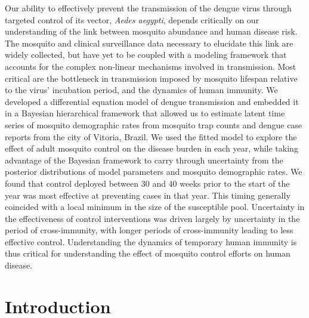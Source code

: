 \documentclass[10pt,letterpaper]{article}
\begin{document}
Our ability to effectively prevent the transmission of the dengue virus through targeted control of its vector, \emph{Aedes aegypti}, depends critically on our understanding of the link between mosquito abundance and human disease risk.
The mosquito and clinical surveillance data necessary to elucidate this link are widely collected, but have yet to be coupled with a modeling framework that accounts for the complex non-linear mechanisms involved in transmission.
Most critical are the bottleneck in transmission imposed by mosquito lifespan relative to the virus' incubation period, and the dynamics of human immunity.
We developed a differential equation model of dengue transmission and embedded it in a Bayesian hierarchical framework that allowed us to estimate latent time series of mosquito demographic rates from mosquito trap counts and dengue case reports from the city of Vitoria, Brazil.
We used the fitted model to explore the effect of adult mosquito control on the disease burden in each year, while taking advantage of the Bayesian framework to carry through uncertainty from the posterior distributions of model parameters and mosquito demographic rates.
We found that control deployed between 30 and 40 weeks prior to the start of the year was most effective at preventing cases in that year. 
This timing generally coincided with a local minimum in the size of the susceptible pool.
Uncertainty in the effectiveness of control interventions was driven largely by uncertainty in the period of cross-immunity, with longer periods of cross-immunity leading to less effective control.
Understanding the dynamics of temporary human immunity is thus critical for understanding the effect of mosquito control efforts on human disease.


\linenumbers

\section*{Introduction}
\end{document}
